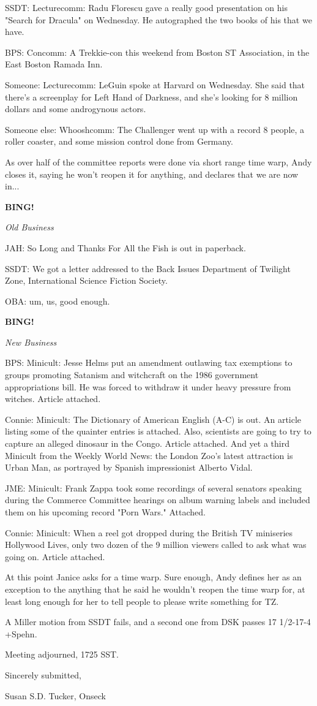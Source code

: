 \documentclass[12pt]{article}
\newcommand{\bing}{{\bf BING!} }
\newcommand{\goto}[1]{\bing \vskip 12pt \centerline{{\em{#1}}}}
\begin{document}
SSDT: Lecturecomm: Radu Florescu gave a really good presentation on his "Search for Dracula" on Wednesday. He autographed the two books of his that we have.

BPS: Concomm: A Trekkie-con this weekend from Boston ST Association, in the East Boston Ramada Inn.

Someone: Lecturecomm: LeGuin spoke at Harvard on Wednesday. She said that there's a screenplay for Left Hand of Darkness, and she's looking for 8 million dollars and some androgynous actors.

Someone else: Whooshcomm: The Challenger went up with a record 8 people, a roller coaster, and some mission control done from Germany.

As over half of the committee reports were done via short range time warp, Andy closes it, saying he won't reopen it for anything, and declares that we are now in...

\goto{Old Business}

JAH: So Long and Thanks For All the Fish is out in paperback.

SSDT: We got a letter addressed to the Back Issues Department of Twilight Zone, International Science Fiction Society.

OBA: um, us, good enough.

\goto{New Business}

BPS: Minicult: Jesse Helms put an amendment outlawing tax exemptions to groups promoting Satanism and witchcraft on the 1986 government appropriations bill. He was forced to withdraw it under heavy pressure from witches. Article attached.

Connie: Minicult: The Dictionary of American English (A-C) is out. An article listing some of the quainter entries is attached. Also, scientists are going to try to capture an alleged dinosaur in the Congo. Article attached. And yet a third Minicult from the Weekly World News: the London Zoo's latest attraction is Urban Man, as portrayed by Spanish impressionist Alberto Vidal.

JME: Minicult: Frank Zappa took some recordings of several senators speaking during the Commerce Committee hearings on album warning labels and included them on his upcoming record "Porn Wars." Attached.

Connie: Minicult: When a reel got dropped during the British TV miniseries Hollywood Lives, only two dozen of the 9 million viewers called to ask what was going on. Article attached.

At this point Janice asks for a time warp. Sure enough, Andy defines her as an exception to the anything that he said he wouldn't reopen the time warp for, at least long enough for her to tell people to please write something for TZ.

A Miller motion from SSDT fails, and a second one from DSK passes 17 1/2-17-4 +Spehn.

\vspace{12pt}

\noindent
Meeting adjourned, 1725 SST.

\vspace{18pt}

\centerline{Sincerely submitted,}
\centerline{Susan S.D. Tucker, Onseck}
\end{document}
